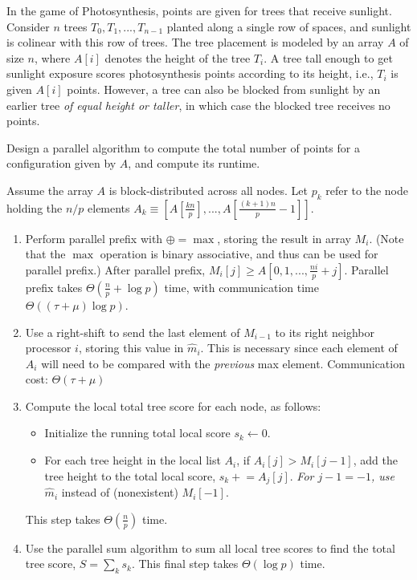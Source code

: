 \documentclass{article}
\newcommand{\?}{\stackrel{?}{=}}
\begin{document}
In the game of Photosynthesis, points are given for trees that receive sunlight.
Consider $n$ trees $T_0,T_1,...,T_{n-1}$ planted along a single row of spaces, and sunlight is colinear with this row of trees.
The tree placement is modeled by an array $A$ of size $n$, where $A[i]$ denotes the height of the tree $T_i$.
A tree tall enough to get sunlight exposure scores photosynthesis points according to its height, i.e., $T_i$ is given $A[i]$ points.
However, a tree can also be blocked from sunlight by an earlier tree \textit{of equal height or taller}, in which case the blocked tree receives no points.

Design a parallel algorithm to compute the total number of points for a configuration given by $A$, and compute its runtime. 

\quad Assume the array $A$ is block-distributed across all nodes.
Let $p_k$ refer to the node holding the $n/p$ elements $A_k \equiv \left[A[\frac{kn}{p}], ..., A[\frac{(k + 1)n}{p} - 1]\right]$.

\begin{enumerate}
  \item Perform parallel prefix with $\oplus = \max$, storing the result in array $M_i$.
  (Note that the $\max$ operation is binary associative, and thus can be used for parallel prefix.)
  After parallel prefix, $M_i[j] \geq A[0,1,...,\frac{ni}{p}+j]$.
  Parallel prefix takes $\Theta(\frac{n}{p} + \log{p})$ time, with communication time $\Theta((\tau + \mu)\log{p})$.
  \item Use a right-shift to send the last element of $M_{i-1}$ to its right neighbor processor $i$, storing this value in $\hat{m}_i$.
      This is necessary since each element of $A_i$ will need to be compared with the \textit{previous} max element.
      Communication cost: $\Theta(\tau + \mu)$
  \item Compute the local total tree score for each node, as follows:
  \begin{itemize}
    \item Initialize the running total local score $s_k \leftarrow 0$.
    \item For each tree height in the local list $A_i$, if $A_i[j] > M_i[j - 1]$, add the tree height to the total local score, $s_k \mathrel{+}= A_j[j]$.
    \textit{For $j - 1 = -1$, use} $\hat{m}_i$ instead of (nonexistent) $M_i[-1]$.
  \end{itemize}
  This step takes $\Theta(\frac{n}{p})$ time.
  \item Use the parallel sum algorithm to sum all local tree scores to find the total tree score, $S = \sum \limits_{k} s_k$.
  This final step takes $\Theta(\log{p})$ time.
\end{enumerate}
\end{document}
